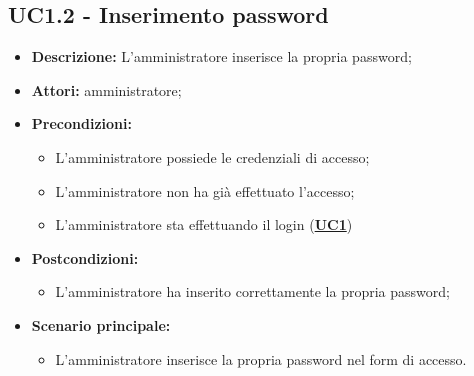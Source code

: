 \documentclass[5pt]{article}
\begin{document}
\subsection{UC1.2 - Inserimento password}
\label{sec:UC1.2}
\begin{itemize}
	\item \textbf{Descrizione:} L’amministratore inserisce la propria password;
	\item \textbf{Attori:} amministratore;
	\item \textbf{Precondizioni:} 
	\begin{itemize}
		\item L’amministratore possiede le credenziali di accesso;
		\item L’amministratore non ha già effettuato l’accesso;
		\item L’amministratore sta effettuando il login (\hyperref[sec:UC1]{\textbf{UC1}})
	\end{itemize}
	\item \textbf{Postcondizioni:} 
	\begin{itemize}
		\item L’amministratore ha inserito correttamente la propria password;
	\end{itemize}
	\item \textbf{Scenario principale:} 
	\begin{itemize}
		\item L’amministratore inserisce la propria password nel form di accesso.
	\end{itemize}
\end{itemize}
\end{document}
